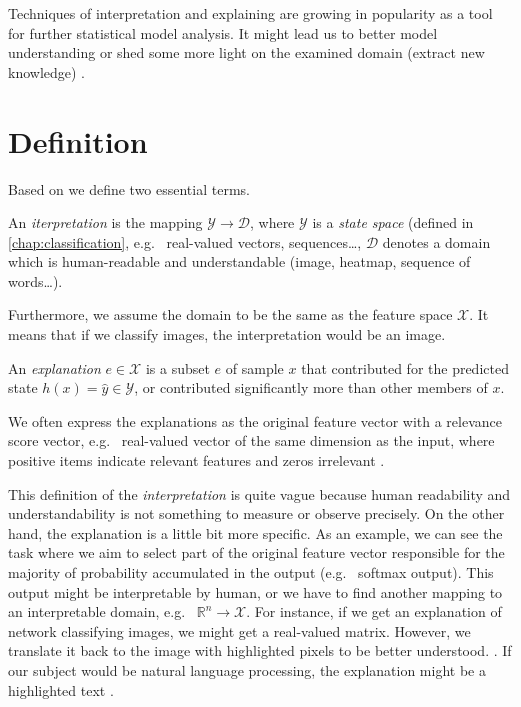 Techniques of interpretation and explaining are growing in popularity as a tool for further statistical model analysis. It might lead us to better model understanding or shed some more light on the examined domain (extract new knowledge) \cite{Montavon2018}.

\section{Definition}
Based on \cite{Montavon2018} we define two essential terms.
\begin{definition}
An \emph{iterpretation} is the mapping $\mathcal{Y}\rightarrow\mathcal{D}$, where $\mathcal{Y}$ is a \emph{state space} (defined in \ref{chap:classification}, e.g. \ real-valued vectors, sequences\dots,  $\mathcal{D}$ denotes a domain which is human-readable and understandable (image, heatmap, sequence of words\dots).
\end{definition}
Furthermore, we assume the domain to be the same as the feature space $\mathcal{X}$. It means that if we classify images, the interpretation would be an image.


\begin{definition}
An \emph{explanation} $e \in \mathcal{X}$ is a subset $e$ of sample $x$ that contributed for the predicted state $h(x)=\hat{y} \in \mathcal{Y}$, or contributed significantly more than other members of $x$.
\end{definition}

We often express the explanations as the original feature vector with a relevance score vector, e.g. \ real-valued vector of the same dimension as the input, where positive items indicate relevant features and zeros irrelevant \cite{Montavon2018}.

This definition of the \emph{interpretation} is quite vague because human readability and understandability is not something to measure or observe precisely. On the other hand, the explanation is a little bit more specific. As an example, we can see the task where we aim to select part of the original feature vector responsible for the majority of probability accumulated in the output (e.g. \ softmax output). This output might be interpretable by human, or we have to find another mapping to an interpretable domain, e.g. \ $\mathbb{R}^{n}\rightarrow\mathcal{X}$. For instance, if we get an explanation of network classifying images, we might get a real-valued matrix. However, we translate it back to the image with highlighted pixels to be better understood. \cite{Lapuschkin2015, Simonyan2014, Landecker2013}. If our subject would be natural language processing, the explanation might be a highlighted text \cite{Arras2017, Li2016}.

